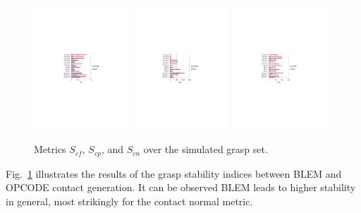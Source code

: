 \begin{figure}
\centering
\includegraphics[width=0.32\textwidth]{images/ssoch/scf_metrics.pdf}
\includegraphics[width=0.32\textwidth]{images/ssoch/scp_metrics.pdf}
\includegraphics[width=0.32\textwidth]{images/ssoch/scn_metrics.pdf}
\caption{Metrics $S_{cf}$, $S_{cp}$, and $S_{cn}$ over the simulated grasp set. }
\label{fig:AllMetrics}
\end{figure}

Fig.~\ref{fig:AllMetrics} illustrates the results of the grasp stability indices between BLEM and OPCODE contact generation. It can be observed BLEM leads to higher stability in general, most strikingly for the contact normal metric.


